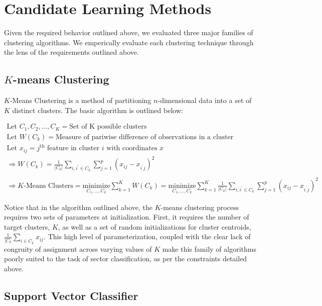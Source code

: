 \documentclass[../main.tex]{subfiles}
\begin{document}
\section{Candidate Learning Methods}

Given the required behavior outlined above, we evaluated three major families of clustering algorithms. We emperically evaluate each clustering technique through the lens of the requirements outlined above.

\subsection{$K$-means Clustering}

$K$-Means Clustering is a method of partitioning $n$-dimensional data into a set of $K$ distinct clusters. The basic algorithm is outlined below:

\begin{gather*}
    \text{Let $C_1, C_2, \ldots, C_K$} = \text{Set of K possible clusters} \\
    \text{Let $W(C_k)$} = \text{Measure of pariwise difference of observations in a cluster} \\
    \text{Let $x_{ij}$} = \text{$j^\text{th}$ feature in cluster $i$ with coordinates $x$} \\
    \Rightarrow W(C_k) = \frac{1}{|C_k|} \sum_{i, i^\prime \in C_k} \sum_{j = 1}^p (x_{ij} - x_{i^\prime j})^2 \\
    \\
    \Rightarrow \text{$K$-Means Clusters}
    = \underset{C_1, \ldots, C_k}{\text{minimize}} \sum_{k=1}^K W(C_k)
    = \underset{C_1, \ldots, C_k}{\text{minimize}} \sum_{k=1}^K \frac{1}{|C_k|} \sum_{i, i^\prime \in C_k} \sum_{j = 1}^p (x_{ij} - x_{i^\prime j})^2
\end{gather*}

Notice that in the algorithm outlined above, the $K$-means clustering process requires two sets of parameters at initialization. First, it requires the number of target clusters, $K$, as well as a set of random initializations for cluster centroids, $\frac{1}{|C_k} \sum_{i \in C_k} x_{ij}$. This high level of parameterization, coupled with the clear lack of congruity of assignment across varying values of $K$ make this family of algorithms poorly suited to the task of sector classification, as per the constraints detailed above.

\subsection{Support Vector Classifier}
\end{document}
